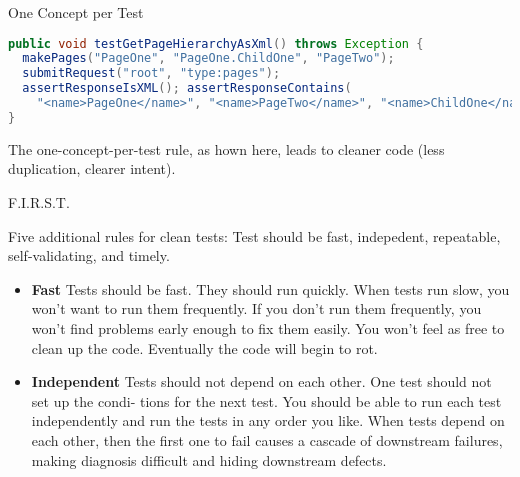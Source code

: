\documentclass{beamer}
\begin{document}
\begin{frame}[fragile]{One Concept per Test}

\begin{lstlisting}[language=Java]
public void testGetPageHierarchyAsXml() throws Exception {
  makePages("PageOne", "PageOne.ChildOne", "PageTwo");
  submitRequest("root", "type:pages");
  assertResponseIsXML(); assertResponseContains(
    "<name>PageOne</name>", "<name>PageTwo</name>", "<name>ChildOne</name>" );
}
\end{lstlisting}

The one-concept-per-test rule, as hown here, leads to cleaner code (less duplication, clearer intent).

\end{frame}

\begin{frame}[fragile]{F.I.R.S.T.}


Five additional rules for clean tests:  Test should be fast, indepedent, repeatable, self-validating, and timely.

\begin{itemize}

\item {\bf Fast} Tests should be fast. They should run quickly. When tests run slow, you won't want to run them frequently. If you don't run them frequently, you won't find problems early enough to fix them easily. You won't feel as free to clean up the code. Eventually the code will begin to rot.

\item {\bf Independent} Tests should not depend on each other. One test should not set up the condi- tions for the next test. You should be able to run each test independently and run the tests in any order you like. When tests depend on each other, then the first one to fail causes a cascade of downstream failures, making diagnosis difficult and hiding downstream defects.

\end{itemize}

\end{frame}
\end{document}
